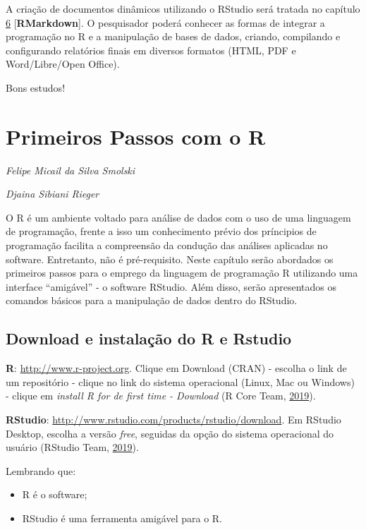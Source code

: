 \documentclass[12pt,brazil,oneside]{book}
\providecommand{\tightlist}{%
  \setlength{\itemsep}{0pt}\setlength{\parskip}{0pt}}
\begin{document}
A criação de documentos dinâmicos utilizando o RStudio será tratada no capítulo \protect\hyperlink{rmark}{6} {[}\textbf{RMarkdown}{]}. O pesquisador poderá conhecer as formas de integrar a programação no R e a manipulação de bases de dados, criando, compilando e configurando relatórios finais em diversos formatos (HTML, PDF e Word/Libre/Open Office).

Bons estudos!

\hypertarget{intro}{%
\chapter{Primeiros Passos com o R}\label{intro}}

\emph{Felipe Micail da Silva Smolski}

\emph{Djaina Sibiani Rieger}

\begin{flushright}
\emph{}
\end{flushright}

O R é um ambiente voltado para análise de dados com o uso de uma linguagem de programação, frente a isso um conhecimento prévio dos príncipios de programação facilita a compreensão da condução das análises aplicadas no software. Entretanto, não é pré-requisito. Neste capítulo serão abordados os primeiros passos para o emprego da linguagem de programação R utilizando uma interface ``amigável'' - o software RStudio. Além disso, serão apresentados os comandos básicos para a manipulação de dados dentro do RStudio.

\hypertarget{download-e-instalacao-do-r-e-rstudio}{%
\section{Download e instalação do R e Rstudio}\label{download-e-instalacao-do-r-e-rstudio}}

\textbf{R}: \url{http://www.r-project.org}. Clique em Download (CRAN) - escolha o link de um repositório - clique no link do sistema operacional (Linux, Mac ou Windows) - clique em \emph{install R for de first time - Download} (R Core Team, \protect\hyperlink{ref-rcore}{2019}).

\textbf{RStudio}: \url{http://www.rstudio.com/products/rstudio/download}. Em RStudio Desktop, escolha a versão \emph{free}, seguidas da opção do sistema operacional do usuário (RStudio Team, \protect\hyperlink{ref-teamrstudio}{2019}).

Lembrando que:

\begin{itemize}
\tightlist
\item
  R é o software;
\item
  RStudio é uma ferramenta amigável para o R.
\end{itemize}
\end{document}
